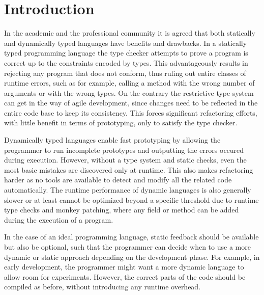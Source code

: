  \section{Introduction}

In the academic and the professional community it is agreed that both statically and dynamically typed languages have benefits and drawbacks. In a statically typed programming language the type checker attempts to prove a program is correct up to the constraints encoded by types.
This advantageously results in rejecting any program that does not conform, thus ruling out entire classes of runtime errors, such as for example, calling a method with the wrong number of arguments or with the wrong types. On the contrary the restrictive type system can get in the way of agile development, since changes need to be reflected in the entire code base to keep its consistency. This forces significant refactoring efforts, with little benefit in terms of prototyping, only to satisfy the type checker.

 Dynamically typed languages enable fast prototyping by allowing the programmer to run incomplete prototypes and outputting the errors occured during execution. However, without a type system and static checks, even the most basic mistakes are discovered only at runtime. This also makes refactoring harder as no tools are available to detect and modify all the related code automatically. The runtime performance of dynamic languages is also generally slower or at least cannot be optimized beyond a specific threshold due to runtime type checks and monkey patching, where any field or method can be added during the execution of a program.

  In the case of an ideal programming language, static feedback should be available but also be optional, such that the programmer can decide when to use a more dynamic or static approach depending on the development phase. For example, in early development, the programmer might want a more dynamic language to allow room for experiments. However, the correct parts of the code should be compiled as before, without introducing any runtime overhead.

